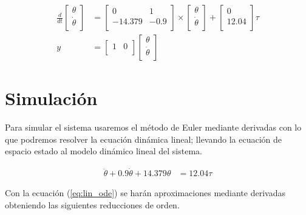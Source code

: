 \documentclass[12pt]{article}
\begin{document}
\begin{equation}
    \begin{split}
        \frac{d}{dt}
    \begin{bmatrix}
        \theta  \\
        \dot{\theta} \\ 
    \end{bmatrix}&=\begin{bmatrix}
        0 & 1  \\
        -14.379 & -0.9 \\ 
    \end{bmatrix}
    \times
    \begin{bmatrix}
     \theta \\
      \dot{\theta} \\
      \end{bmatrix}+\begin{bmatrix}
     0 \\
     12.04 \\
      \end{bmatrix}\tau\\ 
      y&=\begin{bmatrix}
     1 & 0 \\
      \end{bmatrix}
      \begin{bmatrix}
     \theta \\
     \dot{\theta} \\
      \end{bmatrix}
    \end{split}
    \label{eq:lined_model_no_constants}
\end{equation}
\newpage
\section{Simulación}

Para simular el sistema usaremos el método de Euler mediante derivadas con lo que podremos resolver la ecuación dinámica lineal; llevando la ecuación de espacio estado al modelo dinámico lineal del sistema.

\begin{equation}
    \begin{split}
    \ddot{\theta}+0.9\dot{\theta}+14.379\theta&=12.04\tau
    \label{eq:lin_ode}
    \end{split}
\end{equation}

Con la ecuación (\ref{eq:lin_ode}) se harán aproximaciones mediante derivadas obteniendo las siguientes reducciones de orden\cite{reyes:2020}.
\end{document}
